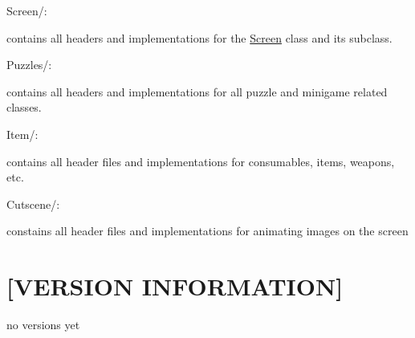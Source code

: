 Screen/\-:
\begin{DoxyItemize}
\item contains all headers and implementations for the \hyperlink{classScreen}{Screen} class and its subclass.
\end{DoxyItemize}

Puzzles/\-:
\begin{DoxyItemize}
\item contains all headers and implementations for all puzzle and minigame related classes.
\end{DoxyItemize}

Item/\-:
\begin{DoxyItemize}
\item contains all header files and implementations for consumables, items, weapons, etc.
\end{DoxyItemize}

Cutscene/\-:
\begin{DoxyItemize}
\item constains all header files and implementations for animating images on the screen
\end{DoxyItemize}

\section*{\mbox{[}V\-E\-R\-S\-I\-O\-N I\-N\-F\-O\-R\-M\-A\-T\-I\-O\-N\mbox{]} }

no versions yet 